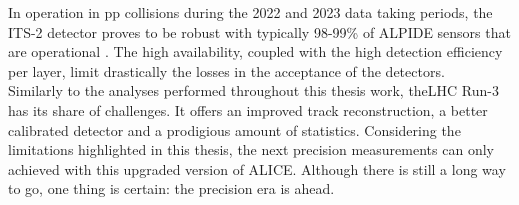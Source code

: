 In operation in pp collisions during the 2022 and 2023 data taking periods, the ITS-2 detector proves to be robust with typically 98-99\% of ALPIDE sensors that are operational \cite{alicecollaborationALICEUpgradesLHC2023}. The high availability, coupled with the high detection efficiency per layer, limit drastically the losses in the acceptance of the detectors.\\

%

Similarly to the analyses performed throughout this thesis work, the\break LHC Run-3 has its share of challenges. It offers an improved track reconstruction, a better calibrated detector and a prodigious amount of statistics. Considering the limitations highlighted in this thesis, the next precision measurements can only achieved with this upgraded version of ALICE. Although there is still a long way to go, one thing is certain: the precision era is ahead.

%

\newpage
    

